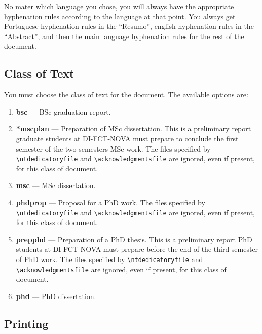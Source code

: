 No mater which language you chose, you will always have the appropriate hyphenation rules according to the language at that point. You always get Portuguese hyphenation rules in the ``Resumo'', english hyphenation rules in the ``Abstract'', and then the main language hyphenation rules for the rest of the document.




\subsection{Class of Text} %
\label{sub:class_of_text}

You must choose the class of text for the document. The available options are:

\begin{enumerate}
	\item \textbf{bsc} --- BSc graduation report.
	\item \textbf{*mscplan} --- Preparation of MSc dissertation. This is a preliminary report graduate students at DI-FCT-NOVA must prepare to conclude the first semester of the two-semesters MSc work. The files specified by \verb!\ntdedicatoryfile! and \verb!\acknowledgmentsfile! are ignored, even if present, for this class of document.
	\item \textbf{msc} --- MSc dissertation.
	\item \textbf{phdprop} ---  Proposal for a PhD work. The files specified by \verb!\ntdedicatoryfile! and \verb!\acknowledgmentsfile! are ignored, even if present, for this class of document.
	\item \textbf{prepphd} ---  Preparation of a PhD thesis. This is a preliminary report PhD students at DI-FCT-NOVA must prepare before the end of the third semester of PhD work. The files specified by \verb!\ntdedicatoryfile! and \verb!\acknowledgmentsfile! are ignored, even if present, for this class of document.
	\item \textbf{phd} --- PhD dissertation.
\end{enumerate}

\subsection{Printing} %
\label{sub:printing}

